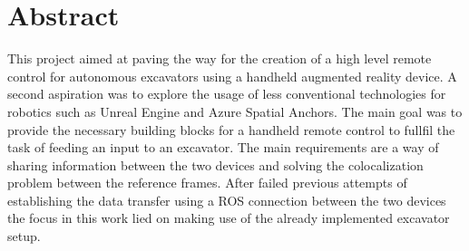 \chapter{Abstract}


This project aimed at paving the way for the creation of a high level remote control for autonomous excavators using a handheld augmented reality device. A second aspiration was to explore the usage of less conventional technologies for robotics such as Unreal Engine and Azure Spatial Anchors. The main goal was to provide the necessary building blocks for a handheld remote control to fullfil the task of feeding an input to an excavator. The main requirements are a way of sharing information between the two devices and solving the colocalization problem between the reference frames. After failed previous attempts of establishing the data transfer using a ROS connection between the two devices the focus in this work lied on making use of the already implemented excavator setup.